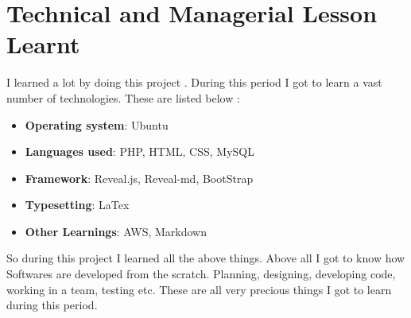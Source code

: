 
\section{Technical and Managerial Lesson Learnt}
I learned a lot by doing this project . During this period I got to learn a vast 
number of technologies. These are listed below :
\begin{itemize}
\item {\bf{Operating system}}: Ubuntu
\item {\bf{Languages used}}: PHP, HTML, CSS, MySQL
\item {\bf{Framework}}: Reveal.js, Reveal-md, BootStrap
\item {\bf{Typesetting}}: LaTex
\item {\bf{Other Learnings}}:  AWS, Markdown

\end{itemize}

So during this project I learned all the above things. Above all I got to know 
how Softwares are developed from the scratch. Planning, designing, developing code, 
working in a team, testing etc. These are all very precious things I got to learn 
during this period.  


